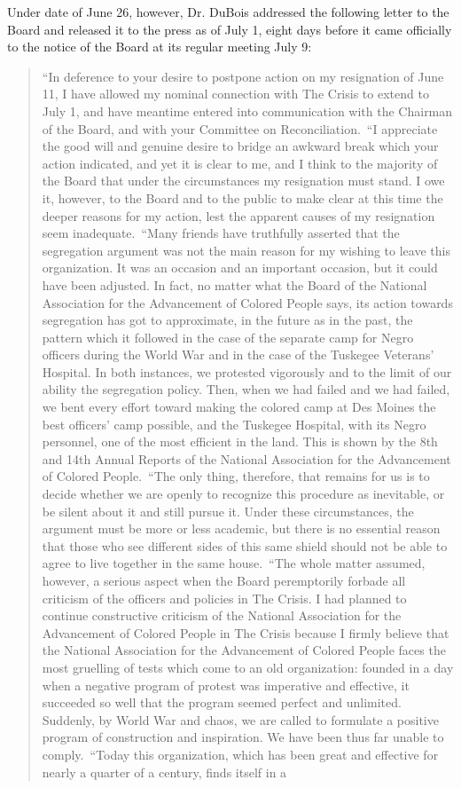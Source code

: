 \documentclass[letterpaper,10pt,english]{jupyterBook}
\begin{document}
\sphinxAtStartPar
Under date of June 26, however, Dr. DuBois addressed the following letter to the Board and released it to the press as of July 1, eight days before it came officially to the notice of the Board at its regular meeting July 9:
\begin{quote}

\sphinxAtStartPar
“In deference to your desire to postpone action on my resignation of June 11, I have allowed my nominal connection with The Crisis to extend to July 1, and have meantime entered into communication with the Chairman of the Board, and with your Committee on Reconciliation. “I appreciate the good will and genuine desire to bridge an awkward break which your action indicated, and yet it is clear to me, and I think to the majority of the Board that under the circumstances my resignation must stand. I owe it, however, to the Board and to the public to make clear at this time the deeper reasons for my action, lest the apparent causes of my resignation seem inadequate. “Many friends have truthfully asserted that the segregation argument was not the main reason for my wishing to leave this organization. It was an occasion and an important occasion, but it could have been adjusted. In fact, no matter what the Board of the National Association for the Advancement of Colored People says, its action towards segregation has got to approximate, in the future as in the past, the pattern which it followed in the case of the separate camp for Negro officers during the World War and in the case of the Tuskegee Veterans’ Hospital. In both instances, we protested vigorously and to the limit of our ability the segregation policy. Then, when we had failed and we had failed, we bent every effort toward making the colored camp at Des Moines the best officers’ camp possible, and the Tuskegee Hospital, with its Negro personnel, one of the most efficient in the land. This is shown by the 8th and 14th Annual Reports of the National Association for the Advancement of Colored People. “The only thing, therefore, that remains for us is to decide whether we are openly to recognize this procedure as inevitable, or be silent about it and still pursue it. Under these circumstances, the argument must be more or less academic, but there is no essential reason that those who see different sides of this same shield should not be able to agree to live together in the same house. “The whole matter assumed, however, a serious aspect when the Board peremptorily forbade all criticism of the officers and policies in The Crisis. I had planned to continue constructive criticism of the National Association for the Advancement of Colored People in The Crisis because I firmly believe that the National Association for the Advancement of Colored People faces the most gruelling of tests which come to an old organization: founded in a day when a negative program of protest was imperative and effective, it succeeded so well that the program seemed perfect and unlimited. Suddenly, by World War and chaos, we are called to formulate a positive program of construction and inspiration. We have been thus far unable to comply. “Today this organization, which has been great and effective for nearly a quarter of a century, finds itself in a 
\end{quote}
\end{document}
